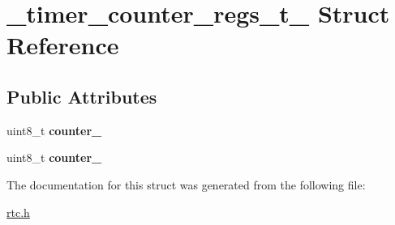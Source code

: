 \hypertarget{struct__timer__counter__regs__t__}{}\section{\+\_\+timer\+\_\+counter\+\_\+regs\+\_\+t\+\_\+ Struct Reference}
\label{struct__timer__counter__regs__t__}
\subsection*{Public Attributes}
\begin{DoxyCompactItemize}
\item 
\mbox{\label{struct__timer__counter__regs__t___a65ec734bb9fb9facfe2e535d6e2a3257}} 
uint8\+\_\+t {\bfseries counter\+\_}
\item 
\mbox{\label{struct__timer__counter__regs__t___a67cf495db41ca66b8f6aafd79fbb219a}} 
uint8\+\_\+t {\bfseries counter\+\_}
\end{DoxyCompactItemize}


The documentation for this struct was generated from the following file\+:\begin{DoxyCompactItemize}
\item 
\hyperlink{rtc_8h}{rtc.\+h}\end{DoxyCompactItemize}
